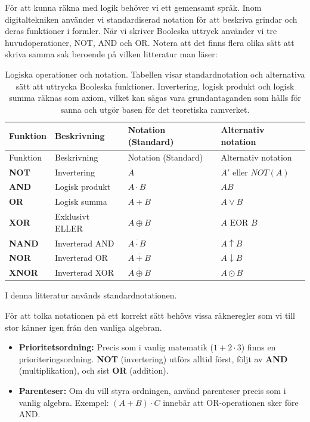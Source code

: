 \documentclass[
  swedish,
  letterpaper,
  oneside,
  openany]{book}
\providecommand{\tightlist}{%
  \setlength{\itemsep}{0pt}\setlength{\parskip}{0pt}}
\begin{document}
För att kunna räkna med logik behöver vi ett gemensamt språk. Inom
digitaltekniken använder vi standardiserad notation för att beskriva
grindar och deras funktioner i formler. När vi skriver Booleska uttryck
använder vi tre huvudoperationer, NOT, AND och OR. Notera att det finns
flera olika sätt att skriva samma sak beroende på vilken litteratur man
läser:

\begin{longtable}[]{@{}llll@{}}
\caption{Logiska operationer och notation. Tabellen visar
standardnotation och alternativa sätt att uttrycka Booleska funktioner.
Invertering, logisk produkt och logisk summa räknas som axiom, vilket
kan sägas vara grundantaganden som hålls för sanna och utgör basen för
det teoretiska ramverket.}\label{tbl-booleska_notationer}\tabularnewline
\toprule\noalign{}
Funktion & Beskrivning & Notation (Standard) & Alternativ notation \\
\midrule\noalign{}
\endfirsthead
\toprule\noalign{}
Funktion & Beskrivning & Notation (Standard) & Alternativ notation \\
\midrule\noalign{}
\endhead
\bottomrule\noalign{}
\endlastfoot
\textbf{NOT} & Invertering & \(\overline{A}\) & \(A'\) eller
\(NOT(A)\) \\
\textbf{AND} & Logisk produkt & \(A \cdot B\) & \(AB\) \\
\textbf{OR} & Logisk summa & \(A + B\) & \(A \lor B\) \\
\textbf{XOR} & Exklusivt ELLER & \(A \oplus B\) &
\(A \text{ EOR } B\) \\
\textbf{NAND} & Inverterad AND & \(\overline{A \cdot B}\) &
\(A \uparrow B\) \\
\textbf{NOR} & Inverterad OR & \(\overline{A + B}\) &
\(A \downarrow B\) \\
\textbf{XNOR} & Inverterad XOR & \(\overline{A \oplus B}\) &
\(A \odot B\) \\
\end{longtable}

I denna litteratur används standardnotationen.

För att tolka notationen på ett korrekt sätt behövs vissa räkneregler
som vi till stor känner igen från den vanliga algebran.

\begin{itemize}
\tightlist
\item
  \textbf{Prioritetsordning:} Precis som i vanlig matematik
  (\(1 + 2 \cdot 3\)) finns en prioriteringsordning. \textbf{NOT}
  (invertering) utförs alltid först, följt av \textbf{AND}
  (multiplikation), och sist \textbf{OR} (addition).
\item
  \textbf{Parenteser:} Om du vill styra ordningen, använd parenteser
  precis som i vanlig algebra. Exempel: \((A + B) \cdot C\) innebär att
  OR-operationen sker före AND.
\end{itemize}
\end{document}
